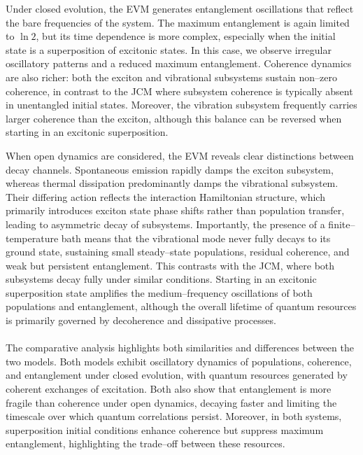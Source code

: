 \documentclass[11pt]{article}
\begin{document}
Under closed evolution, the EVM generates entanglement oscillations that reflect the bare frequencies of the system. The maximum entanglement is again limited to $\ln2$, but its time dependence is more complex, especially when the initial state is a superposition of excitonic states. In this case, we observe irregular oscillatory patterns and a reduced maximum entanglement. Coherence dynamics are also richer: both the exciton and vibrational subsystems sustain non--zero coherence, in contrast to the JCM where subsystem coherence is typically absent in unentangled initial states. Moreover, the vibration subsystem frequently carries larger coherence than the exciton, although this balance can be reversed when starting in an excitonic superposition.

When open dynamics are considered, the EVM reveals clear distinctions between decay channels. Spontaneous emission rapidly damps the exciton subsystem, whereas thermal dissipation predominantly damps the vibrational subsystem. Their differing action reflects the interaction Hamiltonian structure, which primarily introduces exciton state phase shifts rather than population transfer, leading to asymmetric decay of subsystems. Importantly, the presence of a finite--temperature bath means that the vibrational mode never fully decays to its ground state, sustaining small steady--state populations, residual coherence, and weak but persistent entanglement. This contrasts with the JCM, where both subsystems decay fully under similar conditions. Starting in an excitonic superposition state amplifies the medium--frequency oscillations of both populations and entanglement, although the overall lifetime of quantum resources is primarily governed by decoherence and dissipative processes.\\
\\
The comparative analysis highlights both similarities and differences between the two models. Both models exhibit oscillatory dynamics of populations, coherence, and entanglement under closed evolution, with quantum resources generated by coherent exchanges of excitation. Both also show that entanglement is more fragile than coherence under open dynamics, decaying faster and limiting the timescale over which quantum correlations persist. Moreover, in both systems, superposition initial conditions enhance coherence but suppress maximum entanglement, highlighting the trade--off between these resources.
\end{document}
